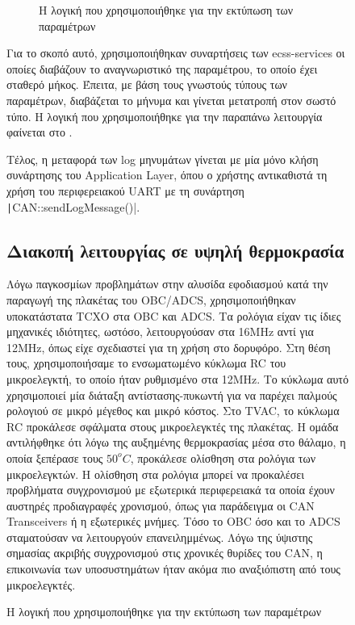 \documentclass[a4paper,nobib,justified]{tufte-book}
\begin{document}
\begin{figure}
\begin{figure}
	\inputminted{c++}{code/examples/parameter-logging.cpp}
	\label{code:parameter-logging}
	\caption{Η λογική που χρησιμοποιήθηκε για την εκτύπωση των παραμέτρων}
\end{figure}
Για το σκοπό αυτό, χρησιμοποιήθηκαν συναρτήσεις των ecss-services οι οποίες διαβάζουν το αναγνωριστικό της παραμέτρου, το οποίο έχει σταθερό μήκος. Έπειτα, με βάση τους γνωστούς τύπους των παραμέτρων, διαβάζεται το μήνυμα και γίνεται μετατροπή στον σωστό τύπο. Η λογική που χρησιμοποιήθηκε για την παραπάνω λειτουργία φαίνεται στο .

Τέλος, η μεταφορά των log μηνυμάτων γίνεται με μία μόνο κλήση συνάρτησης του Application Layer, όπου ο χρήστης αντικαθιστά τη χρήση του περιφερειακού UART με τη συνάρτηση \texttt|CAN::sendLogMessage()|.
\subsection{Διακοπή λειτουργίας σε υψηλή θερμοκρασία}

Λόγω παγκοσμίων προβλημάτων στην αλυσίδα εφοδιασμού κατά την παραγωγή της πλακέτας του OBC/ADCS, χρησιμοποιήθηκαν υποκατάστατα TCXO στα OBC και ADCS. Τα ρολόγια είχαν τις ίδιες μηχανικές ιδιότητες, ωστόσο, λειτουργούσαν στα 16MHz αντί για 12MHz, όπως είχε σχεδιαστεί για τη χρήση στο δορυφόρο. Στη θέση τους, χρησιμοποιήσαμε το ενσωματωμένο κύκλωμα RC του μικροελεγκτή, το οποίο ήταν ρυθμισμένο στα 12MHz. Το κύκλωμα αυτό χρησιμοποιεί μία διάταξη αντίστασης-πυκωντή για να παρέχει παλμούς ρολογιού σε μικρό μέγεθος και μικρό κόστος. Στο TVAC, το κύκλωμα RC προκάλεσε σφάλματα στους μικροελεγκτές της πλακέτας. Η ομάδα αντιλήφθηκε ότι λόγω της αυξημένης θερμοκρασίας μέσα στο θάλαμο, η οποία ξεπέρασε τους $50^o C$, προκάλεσε ολίσθηση στα ρολόγια των μικροελεγκτών. Η ολίσθηση στα ρολόγια μπορεί να προκαλέσει προβλήματα συγχρονισμού με εξωτερικά περιφερειακά τα οποία έχουν αυστηρές προδιαγραφές χρονισμού, όπως για παράδειγμα οι CAN Transceivers ή η εξωτερικές μνήμες. Τόσο το OBC όσο και το ADCS σταματούσαν να λειτουργούν επανειλημμένως. Λόγω της ύψιστης σημασίας ακριβής συγχρονισμού στις χρονικές θυρίδες του CAN, η επικοινωνία των υποσυστημάτων ήταν ακόμα πιο αναξιόπιστη από τους μικροελεγκτές.


\end{figure}
\end{document}
